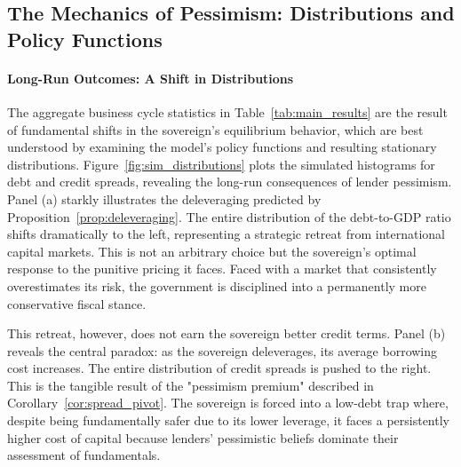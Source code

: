 \documentclass[12pt]{article}
\theoremstyle{plain}
\begin{document}
\subsection{The Mechanics of Pessimism: Distributions and Policy Functions}

\paragraph{Long-Run Outcomes: A Shift in Distributions}
The aggregate business cycle statistics in Table~\ref{tab:main_results} are the
result of fundamental shifts in the sovereign's equilibrium behavior, which are
best understood by examining the model's policy functions and resulting
stationary distributions. Figure~\ref{fig:sim_distributions} plots the
simulated histograms for debt and credit spreads, revealing the long-run
consequences of lender pessimism. Panel (a) starkly illustrates the
deleveraging predicted by Proposition~\ref{prop:deleveraging}. The entire
distribution of the debt-to-GDP ratio shifts dramatically to the left,
representing a strategic retreat from international capital markets. This is
not an arbitrary choice but the sovereign's optimal response to the punitive
pricing it faces. Faced with a market that consistently overestimates its risk,
the government is disciplined into a permanently more conservative fiscal
stance.

This retreat, however, does not earn the sovereign better credit terms. Panel
(b) reveals the central paradox: as the sovereign deleverages, its average
borrowing cost increases. The entire distribution of credit spreads is pushed
to the right. This is the tangible result of the "pessimism premium" described
in Corollary~\ref{cor:spread_pivot}. The sovereign is forced into a low-debt
trap where, despite being fundamentally safer due to its lower leverage, it
faces a persistently higher cost of capital because lenders' pessimistic
beliefs dominate their assessment of fundamentals.
\end{document}
